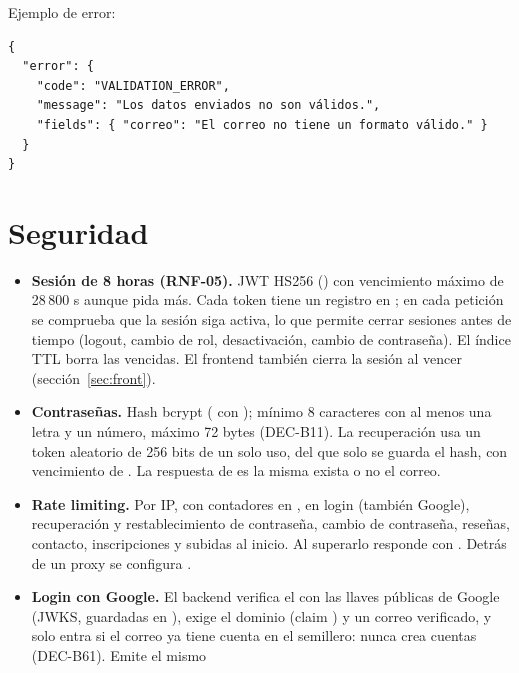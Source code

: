 \documentclass[11pt,a4paper]{article}
\begin{document}
Ejemplo de error:
\begin{lstlisting}[style=json]
{
  "error": {
    "code": "VALIDATION_ERROR",
    "message": "Los datos enviados no son válidos.",
    "fields": { "correo": "El correo no tiene un formato válido." }
  }
}
\end{lstlisting}

\section{Seguridad}

\begin{itemize}
  \item \textbf{Sesi\'on de 8 horas (RNF-05).} JWT HS256 () con vencimiento m\'aximo de 28\,800 s
    aunque  pida m\'as. Cada token tiene un registro en ; en cada petici\'on se
    comprueba que la sesi\'on siga activa, lo que permite cerrar sesiones antes de tiempo (logout, cambio de rol,
    desactivaci\'on, cambio de contrase\~na). El \'indice TTL borra las vencidas. El frontend tambi\'en cierra la
    sesi\'on al vencer (secci\'on~\ref{sec:front}).
  \item \textbf{Contrase\~nas.} Hash bcrypt ( con ); m\'inimo 8 caracteres con
    al menos una letra y un n\'umero, m\'aximo 72 bytes (DEC-B11). La recuperaci\'on usa un token aleatorio de 256 bits
    de un solo uso, del que solo se guarda el hash, con vencimiento de . La respuesta
    de  es la misma exista o no el correo.
  \item \textbf{Rate limiting.} Por IP, con contadores en , en login (tambi\'en Google),
    recuperaci\'on y restablecimiento de contrase\~na, cambio de contrase\~na, rese\~nas, contacto, inscripciones y
    subidas al inicio. Al superarlo responde  con . Detr\'as de un proxy se
    configura .
  \item \textbf{Login con Google.} El backend verifica el  con las llaves p\'ublicas de Google (JWKS,
    guardadas en ), exige el dominio  (claim ) y un correo
    verificado, y solo entra si el correo ya tiene cuenta en el semillero: nunca crea cuentas (DEC-B61). Emite el mismo

\end{itemize}
\end{document}
